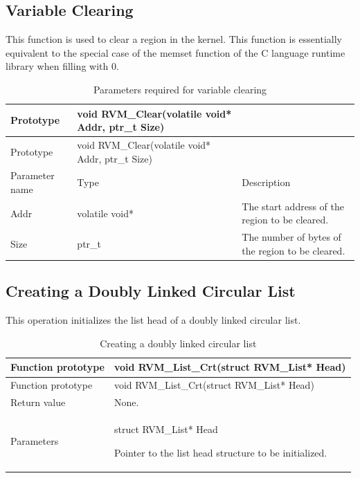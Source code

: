 \subsection{Variable Clearing}\label{subsec:3-6-1}

This function is used to clear a region in the kernel. This function is essentially equivalent to the special case of the memset function of the C language runtime library when filling with 0.

\begin{xltabular}{\textwidth}{@{}>{\hsize\raggedright\arraybackslash}X>{\hsize\raggedright\arraybackslash}X>{\hsize\raggedright\arraybackslash}X@{}}
\caption{Parameters required for variable clearing}\label{tab:3-14}\\
\toprule
Prototype & void RVM\_\allowbreak{}Clear(volatile void* Addr, ptr\_\allowbreak{}t Size)
&\tabularnewline
\endfirsthead
\toprule
Prototype & void RVM\_\allowbreak{}Clear(volatile void* Addr, ptr\_\allowbreak{}t Size)
&\tabularnewline
\midrule
\endhead
\bottomrule
\endlastfoot
Parameter name & Type & Description\tabularnewline
Addr & volatile void* & The start address of the region to be cleared.\tabularnewline
Size & ptr\_\allowbreak{}t & The number of bytes of the region to be cleared.\tabularnewline
\end{xltabular}

\subsection{Creating a Doubly Linked Circular List}\label{subsec:3-6-2}

This operation initializes the list head of a doubly linked circular list.

\begin{xltabular}{\textwidth}{@{}>{\hsize\raggedright\arraybackslash}X>{\hsize\raggedright\arraybackslash}X@{}}
\caption{Creating a doubly linked circular list}\label{tab:3-15}\\
\toprule
Function prototype & void RVM\_\allowbreak{}List\_\allowbreak{}Crt(struct RVM\_\allowbreak{}List* Head)\tabularnewline
\endfirsthead
\toprule
Function prototype & void RVM\_\allowbreak{}List\_\allowbreak{}Crt(struct RVM\_\allowbreak{}List* Head)\tabularnewline
\midrule
\endhead
\bottomrule
\endlastfoot
Return value & None.\tabularnewline
Parameters\strut
 & struct RVM\_\allowbreak{}List* Head

Pointer to the list head structure to be initialized.\strut
\tabularnewline
\end{xltabular}

